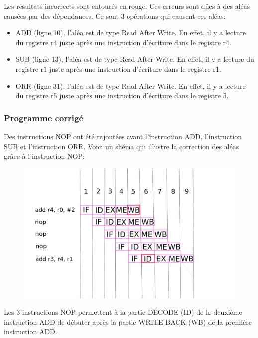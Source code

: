 \documentclass[a4paper]{article} %
\begin{document}
Les résultats incorrects sont entourés en rouge.
Ces erreurs sont dûes à des aléas causées par des dépendances. Ce sont 3 opérations qui causent ces aléas:
\begin{itemize}
    \item ADD (ligne 10), l'aléa est de type Read After Write. En effet, il y a lecture du registre r4 juste après une instruction d'écriture dans le registre r4.
    \item SUB (ligne 13), l'aléa est de type Read After Write. En effet, il y a lecture du registre r1 juste après une instruction d'écriture dans le registre r1.
    \item ORR (ligne 31), l'aléa est de type Read After Write. En effet, il y a lecture du registre r5 juste après une instruction d'écriture dans le registre 5.
\end{itemize}
\subsubsection{Programme corrigé}

Des instructions NOP ont été rajoutées avant l'înstruction ADD, l'instruction SUB et l'instruction ORR.
Voici un shéma qui illustre la correction des aléas grâce à l'instruction NOP:
\begin{figure}[H]
    \centering
    \includegraphics[width=.8\textwidth]{src/ZELE.jpeg}
    \label{fig:nope_zele_pic}
\end{figure}
Les 3 instructions NOP permettent à la partie DECODE (ID) de la deuxième instruction ADD de débuter après la partie WRITE BACK (WB) de la première instruction ADD.
\end{document}
